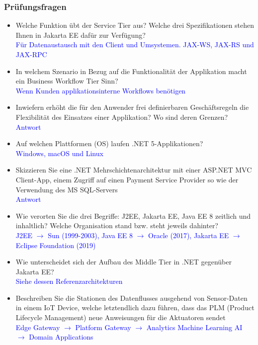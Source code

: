 \subsubsection{Prüfungsfragen}

\begin{itemize}
    \item Welche Funktion übt der Service Tier aus? Welche drei Spezifikationen stehen Ihnen in Jakarta EE dafür zur Verfügung? \\
    \textcolor{blue}{Für Datenaustausch mit den Client und Umsystemen. JAX-WS, JAX-RS und JAX-RPC}
    \item In welchem Szenario in Bezug auf die Funktionalität der Applikation macht ein Business Workflow Tier Sinn? \\
    \textcolor{blue}{Wenn Kunden applikationsinterne Workflows benötigen}
    \item Inwiefern erhöht die für den Anwender frei definierbaren Geschäftsregeln die Flexibilität des Einsatzes einer Applikation? Wo sind deren Grenzen? \\
    \textcolor{blue}{Antwort}
    \item Auf welchen Plattformen (OS) laufen .NET 5-Applikationen? \\
    \textcolor{blue}{Windows, macOS und Linux}
    \item Skizzieren Sie eine .NET Mehrschichtenarchitektur mit einer ASP.NET MVC Client-App, einem Zugriff auf einen Payment Service Provider so wie der Verwendung des MS SQL-Servers \\
    \textcolor{blue}{Antwort}
    \item Wie verorten Sie die drei Begriffe: J2EE, Jakarta EE, Java EE 8 zeitlich und inhaltlich? Welche Organisation stand bzw. steht jeweils dahinter? \\
    \textcolor{blue}{J2EE $\rightarrow$ Sun (1999-2003), Java EE 8 $\rightarrow$ Oracle (2017), Jakarta EE $\rightarrow$ Eclipse Foundation (2019)}
    \item Wie unterscheidet sich der Aufbau des Middle Tier in .NET gegenüber Jakarta EE? \\
    \textcolor{blue}{Siehe dessen Referenzarchitekturen}
    \item Beschreiben Sie die Stationen des Datenflusses ausgehend von Sensor-Daten in einem IoT Device, welche letztendlich dazu führen, dass das PLM (Product Lifecycle Management) neue Anweisungen für die Aktuatoren sendet \\
    \textcolor{blue}{Edge Gateway $\rightarrow$ Platform Gateway $\rightarrow$ Analytics Machine Learning AI $\rightarrow$ Domain Applications}
\end{itemize}

